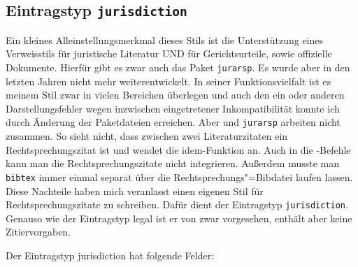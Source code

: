 {}


\subsection{Eintragstyp \texttt{jurisdiction}}


Ein kleines Alleinstellungsmerkmal dieses Stils ist die Unterstützung eines Verweisstils für 
juristische Literatur UND für Gerichtsurteile, sowie offizielle Dokumente. Hierfür gibt es zwar auch 
das Paket \texttt{jurarsp}. Es wurde aber in den letzten Jahren nicht mehr weiterentwickelt. In seiner 
Funktionsvielfalt ist es meinem Stil zwar in vielen Bereichen überlegen und auch den ein oder 
anderen Darstellungsfehler wegen inzwischen eingetretener Inkompatibilität konnte ich durch 
Änderung der Paketdateien erreichen. Aber \bib und \texttt{jurarsp} arbeiten nicht zusammen. So 
sieht \bib 
nicht, dass zwischen zwei Literaturzitaten ein Rechtsprechungszitat ist und wendet die 
idem-Funktion an. Auch in die -Befehle kann man die Rechtsprechungszitate nicht 
integrieren. Außerdem musste man \texttt{bibtex} immer einmal separat über die 
Rechtsprechungs"=Bibdatei laufen lassen. Diese Nachteile haben mich veranlasst einen eigenen Stil 
für Rechtsprechungszitate zu schreiben. Dafür dient der Eintragstyp \texttt{jurisdiction}. Genauso wie 
der 
Eintragstyp legal ist er von \bib zwar vorgesehen, enthält aber keine Zitiervorgaben. 

Der Eintragstyp jurisdiction hat folgende Felder:


